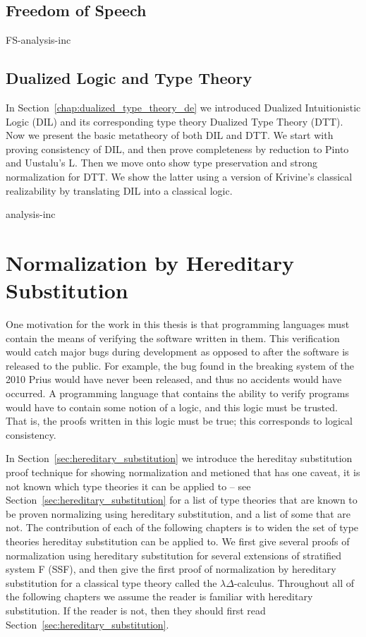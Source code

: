 \documentclass[phd,appendix,dedicationpage,ackpage,epigraphpage]{uithesis}
\begin{document}
\chapter{Freedom of Speech}
\label{chap:freedom_of_speech_anal}
{FS-analysis-inc}

\chapter{Dualized Logic and Type Theory}
\label{chap:dualized_type_theory_anal}

In Section~\ref{chap:dualized_type_theory_de} we introduced Dualized
Intuitionistic Logic (DIL) and its corresponding type theory Dualized
Type Theory (DTT).  Now we present the basic metatheory of both DIL
and DTT.  We start with proving consistency of DIL, and then prove
completeness by reduction to Pinto and Uustalu's L. Then we move onto
show type preservation and strong normalization for DTT.  We show the
latter using a version of Krivine's classical realizability by
translating DIL into a classical logic.

{analysis-inc}

\part{Normalization by Hereditary Substitution}
\label{part:norm-hs}

One motivation for the work in this thesis is that programming
languages must contain the means of verifying the software written in
them.  This verification would catch major bugs during development as
opposed to after the software is released to the public.  For example,
the bug found in the breaking system of the 2010 Prius would have
never been released, and thus no accidents would have occurred.  A
programming language that contains the ability to verify programs
would have to contain some notion of a logic, and this logic must be
trusted.  That is, the proofs written in this logic must be true; this
corresponds to logical consistency.

In Section~\ref{sec:hereditary_substitution} we introduce the
hereditay substitution proof technique for showing normalization and
metioned that has one caveat, it is not known which type theories it
can be applied to -- see Section~\ref{sec:hereditary_substitution} for
a list of type theories that are known to be proven normalizing using
hereditary substitution, and a list of some that are not.  The
contribution of each of the following chapters is to widen the set of
type theories hereditay substitution can be applied to.  We first give
several proofs of normalization using hereditary substitution for
several extensions of stratified system F (SSF), and then give the
first proof of normalization by hereditary substitution for a
classical type theory called the $\lambda\Delta$-calculus.  Throughout
all of the following chapters we assume the reader is familiar with
hereditary substitution.  If the reader is not, then they should first
read Section~\ref{sec:hereditary_substitution}.
\end{document}
